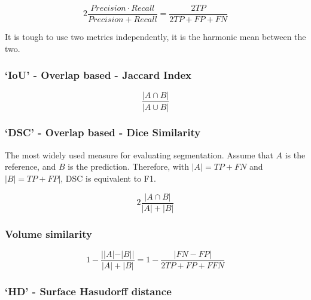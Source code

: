 \documentclass[11pt]{article}
\begin{document}
\begin{definition}[F1 score]
    \begin{equation*}
        2\frac{Precision \cdot Recall}{Precision + Recall} = \frac{2TP}{2TP + FP + FN}
    \end{equation*}
\end{definition}

It is tough to use two metrics independently, it is the harmonic mean between the two.

\subsubsection{`IoU' - Overlap based - Jaccard Index}

\begin{definition}
    \begin{equation*}
        \frac{|A\cap B|}{|A \cup B|}
    \end{equation*}
\end{definition}

\subsubsection{`DSC' - Overlap based - Dice Similarity}

The most widely used measure for evaluating segmentation. Assume that $A$ is the reference, and $B$ is the prediction. Therefore, with $|A| = TP + FN$ and $|B| = TP + FP|$, DSC is equivalent to F1.

\begin{definition}[DICE]
    \begin{equation*}
        2\frac{|A\cap B|}{|A|+|B|}
    \end{equation*}
\end{definition}

\subsubsection{Volume similarity}

\begin{definition}
    \begin{equation*}
        1 - \frac{||A| - |B||}{|A| + |B|} = 1 - \frac{|FN - FP|}{2TP + FP +F FN}
    \end{equation*}
\end{definition}

\subsubsection{`HD' - Surface Hasudorff distance}
\end{document}

